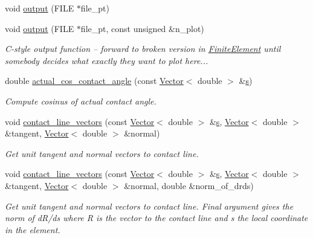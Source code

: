 \begin{DoxyCompactItemize}
void \hyperlink{classoomph_1_1YoungLaplaceContactAngleElement_a589f36dd06e87691b15d1f9700311833}{output} (F\+I\+LE $\ast$file\+\_\+pt)
\item 
void \hyperlink{classoomph_1_1YoungLaplaceContactAngleElement_adbabdfc299dcc79b82870690ccd9ec64}{output} (F\+I\+LE $\ast$file\+\_\+pt, const unsigned \&n\+\_\+plot)
\begin{DoxyCompactList}\small\item\em C-\/style output function -- forward to broken version in \hyperlink{classoomph_1_1FiniteElement}{Finite\+Element} until somebody decides what exactly they want to plot here... \end{DoxyCompactList}\item 
double \hyperlink{classoomph_1_1YoungLaplaceContactAngleElement_a39f908b46a8fbf92f8997f8acafd64ee}{actual\+\_\+cos\+\_\+contact\+\_\+angle} (const \hyperlink{classoomph_1_1Vector}{Vector}$<$ double $>$ \&\hyperlink{cfortran_8h_ab7123126e4885ef647dd9c6e3807a21c}{s})
\begin{DoxyCompactList}\small\item\em Compute cosinus of actual contact angle. \end{DoxyCompactList}\item 
void \hyperlink{classoomph_1_1YoungLaplaceContactAngleElement_acfe3c702386c20a1f769be260cccb9d2}{contact\+\_\+line\+\_\+vectors} (const \hyperlink{classoomph_1_1Vector}{Vector}$<$ double $>$ \&\hyperlink{cfortran_8h_ab7123126e4885ef647dd9c6e3807a21c}{s}, \hyperlink{classoomph_1_1Vector}{Vector}$<$ double $>$ \&tangent, \hyperlink{classoomph_1_1Vector}{Vector}$<$ double $>$ \&normal)
\begin{DoxyCompactList}\small\item\em Get unit tangent and normal vectors to contact line. \end{DoxyCompactList}\item 
void \hyperlink{classoomph_1_1YoungLaplaceContactAngleElement_ad0dfedac360bd5a6975a199f7dc3d8bd}{contact\+\_\+line\+\_\+vectors} (const \hyperlink{classoomph_1_1Vector}{Vector}$<$ double $>$ \&\hyperlink{cfortran_8h_ab7123126e4885ef647dd9c6e3807a21c}{s}, \hyperlink{classoomph_1_1Vector}{Vector}$<$ double $>$ \&tangent, \hyperlink{classoomph_1_1Vector}{Vector}$<$ double $>$ \&normal, double \&norm\+\_\+of\+\_\+drds)
\begin{DoxyCompactList}\small\item\em Get unit tangent and normal vectors to contact line. Final argument gives the norm of d\+R/ds where R is the vector to the contact line and s the local coordinate in the element. \end{DoxyCompactList}\item 

\end{DoxyCompactItemize}
